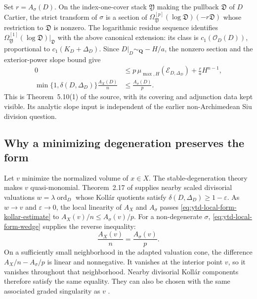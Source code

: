 Set $r=A_\sigma(D)$. On the index-one-cover stack
$\mathfrak Y$ making the pullback $\mathfrak D$ of $D$ Cartier,
the strict transform of $\sigma$ is a section of
$\Omega_{\mathfrak Y}^{[p]}(\log\mathfrak D)(-r\mathfrak D)$
whose restriction to $\mathfrak D$ is nonzero.
The logarithmic residue sequence identifies
$\Omega_{\mathfrak Y}^{[1]}(\log\mathfrak D)|_{\mathfrak D}$
with the above canonical extension:
its class is $c_1({\mathcal O}_D(D))$, proportional to
$c_1(K_D+\Delta_D)$. Since $D|_D\sim_{\mathbf Q}-H/a$,
the nonzero section and the exterior-power slope bound give
\[
\tag{68.23bo}\label{eq:ytd-local-form-kollar-estimate}
 \begin{aligned}
 0&\leq p\,\mu_{\max,H}({\mathcal E}_{D,\Delta_D})
                      +\frac r a H^{n-1},\\
 \min\{1,\delta(D,\Delta_D)\}\frac{A_X(D)}n
   &\leq\frac{A_\sigma(D)}p.
 \end{aligned}
\]
This is Theorem~5.10(1) of the source, with its covering and
adjunction data kept visible. Its analytic slope input is independent
of the earlier non-Archimedean Siu division question.

\subsection{Why a minimizing degeneration preserves the form}
\label{sec:ytd-local-klt-form-specialization}

Let $v$ minimize the normalized volume of $x\in X$.
The stable-degeneration theory makes $v$ quasi-monomial.
Theorem~2.17 of \cite{XuZhuang26StableFormsV2} supplies nearby
scaled divisorial valuations $w=\lambda\operatorname{ord}_D$
whose Koll\'ar quotients satisfy $\delta(D,\Delta_D)\geq1-\varepsilon$.
As $w\to v$ and $\varepsilon\to0$, the local linearity of
$A_X$ and $A_\sigma$ passes \eqref{eq:ytd-local-form-kollar-estimate}
to $A_X(v)/n\leq A_\sigma(v)/p$. For a non-degenerate $\sigma$,
\eqref{eq:ytd-local-form-wedge} supplies the reverse inequality:
\[
\tag{68.23bp}\label{eq:ytd-local-form-minimizer-equality}
 \frac{A_X(v)}n=\frac{A_\sigma(v)}p.
\]
On a sufficiently small neighborhood in the adapted valuation cone,
the difference $A_X/n-A_\sigma/p$ is linear and nonnegative.
It vanishes at the interior point $v$, so it vanishes throughout
that neighborhood. Nearby divisorial Koll\'ar components therefore
satisfy the same equality. They can also be chosen with the same
associated graded singularity as $v$
\cite[Lemma~2.10]{LiXu19HigherRankV2}.


